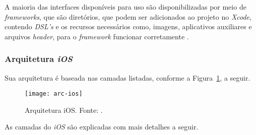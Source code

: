 A maioria das interfaces disponíveis para uso são disponibilizadas por meio de \textit{frameworks}, 
que são diretórios, que podem ser adicionados ao projeto no \textit{Xcode}, contendo \textit{DSL's} e os recursos necessários como, 
imagens, aplicativos auxiliares e arquivos \textit{header}, para o \textit{framework} funcionar corretamente \cite{apple_inc_tech_2014}.

\subsubsection{Arquitetura \textit{iOS}} \label{subsubsection:arc-ios}
Sua arquitetura é baseada nas camadas listadas, conforme a Figura~\ref{fig:arc-ios}, a seguir.
 
\begin{figure}[H]
  \centering
    \texttt{[image: arc-ios]}
    \caption[Arquitetura iOS]{ Arquitetura iOS. Fonte: \cite{apple_inc_tech_2014}.}
	\label{fig:arc-ios}
\end{figure}

As camadas do \textit{iOS} são explicadas com mais detalhes a seguir.
 
